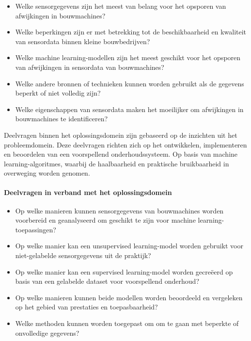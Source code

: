 \begin{itemize}
    \item Welke sensorgegevens zijn het meest van belang voor het opsporen van afwijkingen in bouwmachines?
    
    \item Welke beperkingen zijn er met betrekking tot de beschikbaarheid en kwaliteit van sensordata binnen kleine bouwbedrijven?
    
    \item Welke machine learning-modellen zijn het meest geschikt voor het opsporen van afwijkingen in sensordata van bouwmachines?
    
    \item Welke andere bronnen of technieken kunnen worden gebruikt als de gegevens beperkt of niet volledig zijn?
    
    \item Welke eigenschappen van sensordata maken het moeilijker om afwijkingen in bouwmachines te identificeren?
\end{itemize}

Deelvragen binnen het oplossingsdomein zijn gebaseerd op de inzichten uit het probleemdomein. Deze deelvragen richten zich op het ontwikkelen, implementeren en beoordelen van een voorspellend onderhoudssysteem. Op basis van machine learning-algoritmes, waarbij de haalbaarheid en praktische bruikbaarheid in overweging worden genomen.

\paragraph{Deelvragen in verband met het oplossingsdomein}

\begin{itemize}
    \item Op welke manieren kunnen sensorgegevens van bouwmachines worden voorbereid en geanalyseerd om geschikt te zijn voor machine learning-toepassing\-en?
    
    \item Op welke manier kan een unsupervised learning-model worden gebruikt voor niet-gelabelde sensorgegevens uit de praktijk?
    
    \item Op welke manier kan een supervised learning-model worden gecreëerd op basis van een gelabelde dataset voor voorspellend onderhoud?
    
    \item Op welke manieren kunnen beide modellen worden beoordeeld en vergeleken op het gebied van prestaties en toepasbaarheid?
    
    \item Welke methoden kunnen worden toegepast om om te gaan met beperkte of onvolledige gegevens?
\end{itemize}


